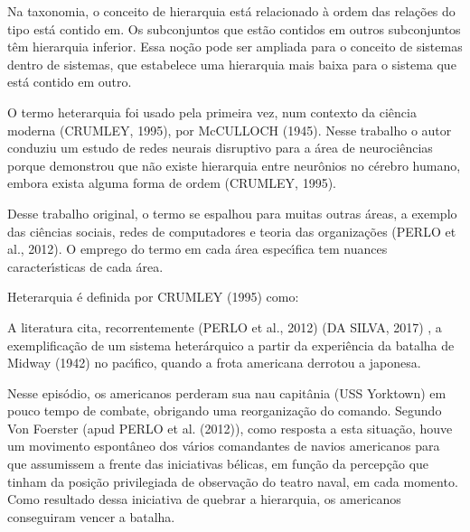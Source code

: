 \documentclass[
12pt,		%
openright,	%
twoside,  %
a4paper,			%
chapter=TITLE,		%
english,			%
french,				%
spanish,			%
brazil				%
]{USPSC-classe/USPSC}
\begin{document}
Na taxonomia, o conceito de hierarquia est\'a relacionado \`a ordem das rela\c{c}\~oes do tipo \textquotedbl est\'a contido em\textquotedbl . Os subconjuntos que est\~ao contidos em outros subconjuntos t\^em hierarquia inferior. Essa no\c{c}\~ao pode ser ampliada para o conceito de \textquotedbl sistemas dentro de sistemas\textquotedbl , que estabelece uma hierarquia mais baixa para o sistema que est\'a contido em outro.




O termo heterarquia foi usado pela primeira vez, num contexto da ci\^encia moderna  (CRUMLEY, 1995), por  McCULLOCH (1945).  Nesse trabalho o autor conduziu um estudo de redes neurais disruptivo para a \'area de neuroci\^encias porque demonstrou que n\~ao existe hierarquia entre neur\^onios no c\'erebro humano, embora exista alguma forma de ordem  (CRUMLEY, 1995).




Desse trabalho original, o termo se espalhou para muitas outras \'areas, a exemplo das ci\^encias sociais, redes de computadores e teoria das organiza\c{c}\~oes  (PERLO et al., 2012). O emprego do termo em cada \'area espec\'{\i}fica tem nuances caracter\'{\i}sticas de cada \'area.




Heterarquia \'e definida por  CRUMLEY (1995) como:





\noindent\begin{center}\mbox{\centering{}}\end{center}


A literatura cita, recorrentemente  (PERLO et al., 2012) (DA SILVA, 2017) , a exemplifica\c{c}\~ao de um sistema heter\'arquico a partir da experi\^encia da batalha de Midway (1942) no pac\'{\i}fico, quando a frota americana derrotou a japonesa.




Nesse epis\'odio, os americanos perderam sua nau capit\^ania (USS Yorktown) em pouco tempo de combate, obrigando uma reorganiza\c{c}\~ao do comando. Segundo Von Foerster (apud  PERLO et al. (2012)), como resposta a esta situa\c{c}\~ao, houve um movimento espont\^aneo dos v\'arios comandantes de navios americanos para que assumissem a frente das iniciativas b\'elicas, em fun\c{c}\~ao da percep\c{c}\~ao que tinham da posi\c{c}\~ao privilegiada de observa\c{c}\~ao do teatro naval, em cada momento. Como resultado dessa iniciativa de \textquotedbl quebrar a hierarquia\textquotedbl , os americanos conseguiram vencer a batalha.
\end{document}
